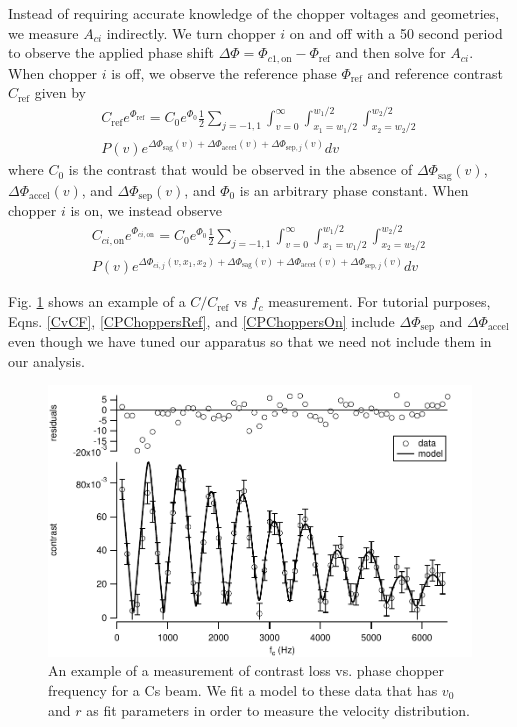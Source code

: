 \documentclass[twocolumn,prl,showpacs,superscriptaddress]{revtex4-1}   %
\newcommand{\figref}[1]{Fig. \ref{#1}}
\newcommand{\dphisep}{\Delta\Phi_{\mathrm{sep}}}
\newcommand{\dphisepj}{\Delta\Phi_{\mathrm{sep},j}}
\newcommand{\dphisag}{\Delta\Phi_{\mathrm{sag}}}
\newcommand{\dphiaccel}{\Delta\Phi_{\mathrm{accel}}}
\begin{document}
Instead of requiring accurate knowledge of the chopper voltages and geometries, we measure $A_{ci}$ indirectly. We turn chopper $i$ on and off with a 50 second period to observe the applied phase shift $\Delta\Phi = \Phi_{c1,\mathrm{on}} - \Phi_{\mathrm{ref}}$ and then solve for $A_{ci}$. When chopper $i$ is off, we observe the reference phase $\Phi_{\mathrm{ref}}$ and reference contrast $C_{\mathrm{ref}}$ given by 
\begin{align}
	C_{\mathrm{ref}}e^{\Phi_{\mathrm{ref}}} = 
		C_0e^{\Phi_0} \frac{1}{2} \sum_{j=-1,1}
		\int_{v=0}^{\infty}
		\int_{x_1=w_1/2}^{w_1/2}
		\int_{x_2=w_2/2}^{w_2/2} 
		\nonumber \\
		P(v) e^{\dphisag(v) + \dphiaccel(v) + \dphisepj(v)} 
		dv
	\label{CPChoppersRef}
\end{align}
where $C_0$ is the contrast that would be observed in the absence of $\dphisag(v)$, $\dphiaccel(v)$, and $\dphisep(v)$, and $\Phi_0$ is an arbitrary phase constant. When chopper $i$ is on, we instead observe
\begin{align}
	C_{ci,\mathrm{on}}e^{\Phi_{ci,\mathrm{on}}} = 
		C_0e^{\Phi_0} \frac{1}{2} \sum_{j=-1,1}
		\int_{v=0}^{\infty}
		\int_{x_1=w_1/2}^{w_1/2}
		\int_{x_2=w_2/2}^{w_2/2} 
		\nonumber \\
		P(v) e^{\Delta\Phi_{ci,j}(v,x_1,x_2) + \dphisag(v) + \dphiaccel(v) + \dphisepj(v)} 
		dv
	\label{CPChoppersOn}
\end{align}

\figref{CvCFExample} shows an example of a $C/C_{\mathrm{ref}}$ vs $f_c$ measurement. 
For tutorial purposes, Eqns. \eqref{CvCF}, \eqref{CPChoppersRef}, and \eqref{CPChoppersOn} include $\dphisep$ and $\dphiaccel$ even though we have tuned our apparatus so that we need not include them in our analysis.

\begin{figure}
\includegraphics[width=\linewidth,keepaspectratio]{CvCF_150420_o.pdf}
\caption{\label{CvCFExample}An example of a measurement of contrast loss vs. phase chopper frequency for a Cs beam. We fit a model to these data that has $v_0$ and $r$ as fit parameters in order to measure the velocity distribution.}
\end{figure}
	
\end{document}
